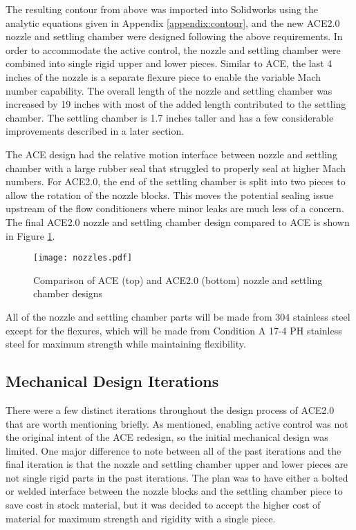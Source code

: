 The resulting contour from above was imported into Solidworks using the analytic equations given in Appendix \ref{appendix:contour}, and the new ACE2.0 nozzle and settling chamber were designed following the above requirements. In order to accommodate the active control, the nozzle and settling chamber were combined into single rigid upper and lower pieces. Similar to ACE, the last 4 inches of the nozzle is a separate flexure piece to enable the variable Mach number capability. The overall length of the nozzle and settling chamber was increased by 19 inches with most of the added length contributed to the settling chamber. The settling chamber is 1.7 inches taller and has a few considerable improvements described in a later section. 

The ACE design had the relative motion interface between nozzle and settling chamber with a large rubber seal that struggled to properly seal at higher Mach numbers. For ACE2.0, the end of the settling chamber is split into two pieces to allow the rotation of the nozzle blocks. This moves the potential sealing issue upstream of the flow conditioners where minor leaks are much less of a concern. The final ACE2.0 nozzle and settling chamber design compared to ACE is shown in Figure \ref{fig:nozzles}. 

\begin{figure}[ht!]
    \centering
    \texttt{[image: nozzles.pdf]}
    \caption{Comparison of ACE (top) and ACE2.0 (bottom) nozzle and settling chamber designs}
    \label{fig:nozzles}
\end{figure}

All of the nozzle and settling chamber parts will be made from 304 stainless steel except for the flexures, which will be made from Condition A 17-4 PH stainless steel for maximum strength while maintaining flexibility.

\subsection{Mechanical Design Iterations}

There were a few distinct iterations throughout the design process of ACE2.0 that are worth mentioning briefly. As mentioned, enabling active control was not the original intent of the ACE redesign, so the initial mechanical design was limited. One major difference to note between all of the past iterations and the final iteration is that the nozzle and settling chamber upper and lower pieces are not single rigid parts in the past iterations. The plan was to have either a bolted or welded interface between the nozzle blocks and the settling chamber piece to save cost in stock material, but it was decided to accept the higher cost of material for maximum strength and rigidity with a single piece.

